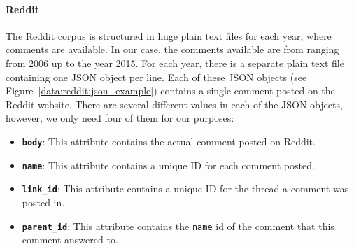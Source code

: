 \paragraph{Reddit} The Reddit corpus is structured in huge plain text files for each year, where comments are available. In our case, the comments available are from ranging from 2006 up to the year 2015. For each year, there is a separate plain text file containing one JSON object per line. Each of these JSON objects (see Figure~\ref{data:reddit:json_example}) contains a single comment posted on the Reddit website. There are several different values in each of the JSON objects, however, we only need four of them for our purposes: 

\begin{itemize}[noitemsep]
	\item \textbf{\texttt{body}}: This attribute contains the actual comment posted on Reddit.
	\item \textbf{\texttt{name}}: This attribute contains a unique ID for each comment posted.
	\item \textbf{\texttt{link\_id}}: This attribute contains a unique ID for the thread a comment was posted in.
	\item \textbf{\texttt{parent\_id}}: This attribute contains the \texttt{name} id of the comment that this comment answered to.
\end{itemize}

